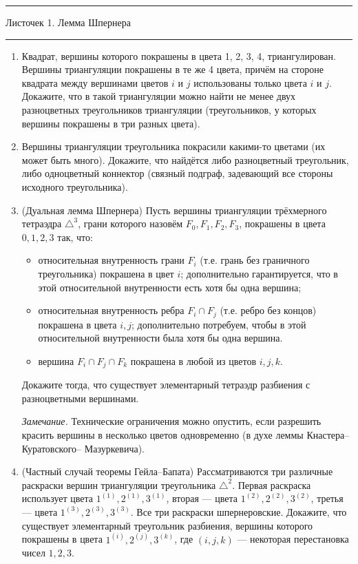 \documentclass[12pt]{article}
\newcommand{\HRule}{\rule{\linewidth}{0.5mm}}
\begin{document}
{
\HRule
 \normalfont \Large \center
   Листочек 1. Лемма Шпернера

\HRule
}



\begin{enumerate}
\setcounter{enumi}{0}
\item Квадрат, вершины которого покрашены в цвета 1, 2, 3, 4, триангулирован. Вершины триангуляции покрашены в те же 4 цвета, причём на стороне квадрата между вершинами цветов $i$ и $j$ использованы только цвета $i$ и $j$. Докажите, что в такой триангуляции можно найти не менее двух разноцветных треугольников триангуляции (треугольников, у которых вершины покрашены в три разных цвета).
    
  \item Вершины триангуляции треугольника покрасили какими-то цветами (их может быть много). Докажите, что найдётся либо разноцветный треугольник, либо одноцветный коннектор (связный подграф, задевающий все стороны исходного треугольника).

  \item (Дуальная лемма Шпернера) Пусть вершины триангуляции трёхмерного тетраэдра $\triangle^{3}$, грани которого назовём $F_0, F_1, F_2, F_3$, покрашены в цвета $0, 1, 2, 3$ так, что:
   \begin{itemize}
   \item относительная внутренность грани $F_i$ (т.е. грань без граничного треугольника) покрашена в цвет $i$; дополнительно гарантируется, что в этой относительной внутренности есть хотя бы одна вершина;

   \item относительная внутренность ребра $F_i \cap F_j$ (т.е. ребро без концов) покрашена в цвета $i,j$; дополнительно потребуем, чтобы в этой относительной внутренности была хотя бы одна вершина.

   \item вершина $F_i \cap F_j \cap F_k$ покрашена в любой из цветов $i,j,k$.
   \end{itemize}

   Докажите тогда, что существует элементарный тетраэдр разбиения с разноцветными вершинами.

   \emph{Замечание.} Технические ограничения можно опустить, если разрешить красить вершины в несколько цветов одновременно (в духе леммы Кнастера--Куратовского-- Мазуркевича).

  \item (Частный случай теоремы Гейла--Бапата) Рассматриваются три различные раскраски вершин триангуляции треугольника $\triangle^{2}$. Первая раскраска использует цвета $1^{(1)}, 2^{(1)}, 3^{(1)}$, вторая --- цвета $1^{(2)}, 2^{(2)}, 3^{(2)}$, третья --- цвета $1^{(3)}, 2^{(3)}, 3^{(3)}$. Все три раскраски шпернеровские. Докажите, что существует элементарный треугольник разбиения, вершины которого покрашены в цвета $1^{(i)}, 2^{(j)}, 3^{(k)}$, где $(i, j, k)$ ---  некоторая перестановка чисел $1,2,3$.


\end{enumerate}
\end{document}
